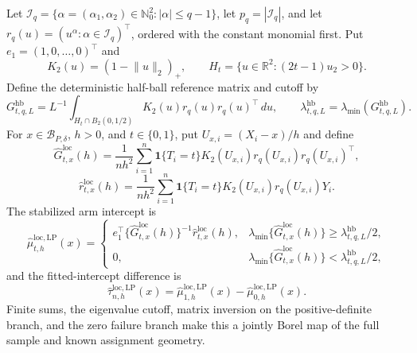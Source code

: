 Let \(\mathcal I_q=\{\alpha=(\alpha_1,\alpha_2)\in\mathbb N_0^2:|\alpha|\leq q-1\}\), let \(p_q=|\mathcal I_q|\), and let \(r_q(u)=(u^\alpha:\alpha\in\mathcal I_q)^\top\), ordered with the constant monomial first.  Put \(e_1=(1,0,\ldots,0)^\top\) and
\[
 K_2(u)=(1-\lVert u\rVert_2)_+,
 \qquad H_t=\{u\in\mathbb R^2:(2t-1)u_2>0\}.
\]
Define the deterministic half-ball reference matrix and cutoff by
\[
 G^{\mathrm{hb}}_{t,q,L}
 =L^{-1}\int_{H_t\cap B_2(0,1/2)}
 K_2(u)r_q(u)r_q(u)^\top\,du,
 \qquad
 \lambda^{\mathrm{hb}}_{t,q,L}
 =\lambda_{\min}(G^{\mathrm{hb}}_{t,q,L}).
\]
For \(x\in\mathcal B_{P,\delta}\), \(h>0\), and \(t\in\{0,1\}\), put \(U_{x,i}=(X_i-x)/h\) and define
\[
 \widehat G^{\mathrm{loc}}_{t,x}(h)
 =\frac1{nh^2}\sum_{i=1}^n
 \mathbf 1\{T_i=t\}K_2(U_{x,i})r_q(U_{x,i})r_q(U_{x,i})^\top,
\]
\[
 \widehat r^{\mathrm{loc}}_{t,x}(h)
 =\frac1{nh^2}\sum_{i=1}^n
 \mathbf 1\{T_i=t\}K_2(U_{x,i})r_q(U_{x,i})Y_i.
\]
The stabilized arm intercept is
\[
 \widehat\mu^{\mathrm{loc},\mathrm{LP}}_{t,h}(x)
 =\begin{cases}
 e_1^\top\{\widehat G^{\mathrm{loc}}_{t,x}(h)\}^{-1}
 \widehat r^{\mathrm{loc}}_{t,x}(h),
 &\lambda_{\min}\{\widehat G^{\mathrm{loc}}_{t,x}(h)\}
 \geq\lambda^{\mathrm{hb}}_{t,q,L}/2,\\
 0,&\lambda_{\min}\{\widehat G^{\mathrm{loc}}_{t,x}(h)\}
 <\lambda^{\mathrm{hb}}_{t,q,L}/2,
 \end{cases}
\]
and the fitted-intercept difference is
\[
 \widehat\tau^{\mathrm{loc},\mathrm{LP}}_{n,h}(x)
 =\widehat\mu^{\mathrm{loc},\mathrm{LP}}_{1,h}(x)
 -\widehat\mu^{\mathrm{loc},\mathrm{LP}}_{0,h}(x).
\]
Finite sums, the eigenvalue cutoff, matrix inversion on the positive-definite branch, and the zero failure branch make this a jointly Borel map of the full sample and known assignment geometry.